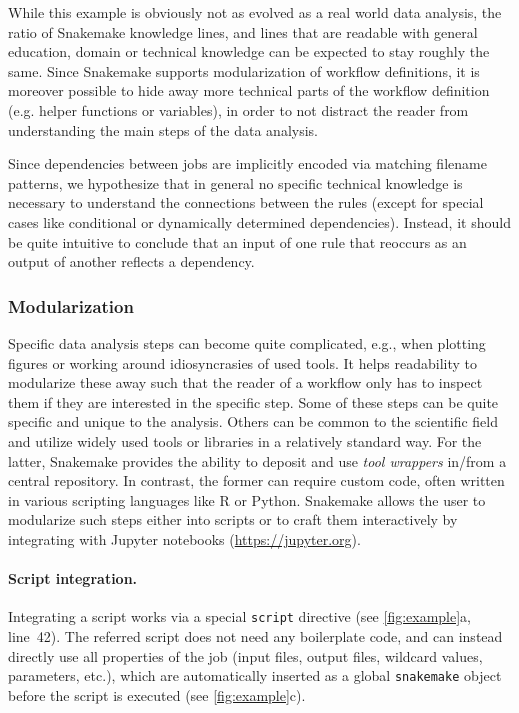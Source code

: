 \documentclass[parskip=half]{scrartcl}
\let\plainurl\url
\renewcommand{\url}[1]{\protect\plainurl{#1}}
\begin{document}
While this example is obviously not as evolved as a real world data analysis, the ratio of Snakemake knowledge lines, and lines that are readable with general education, domain or technical knowledge can be expected to stay roughly the same.
Since Snakemake supports modularization of workflow definitions, it is moreover possible to hide away more technical parts of the workflow definition (e.g. helper functions or variables), in order to not distract the reader from understanding the main steps of the data analysis.

Since dependencies between jobs are implicitly encoded via matching filename patterns, we hypothesize that in general no specific technical knowledge is necessary to understand the connections between the rules (except for special cases like conditional or dynamically determined dependencies).
Instead, it should be quite intuitive to conclude that an input of one rule that reoccurs as an output of another reflects a dependency.

\subsubsection{Modularization}\label{sec:modularization}

Specific data analysis steps can become quite complicated, e.g., when plotting figures or working around idiosyncrasies of used tools.
It helps readability to modularize these away such that the reader of a workflow only has to inspect them if they are interested in the specific step.
Some of these steps can be quite specific and unique to the analysis.
Others can be common to the scientific field and utilize widely used tools or libraries in a relatively standard way.
For the latter, Snakemake provides the ability to deposit and use \emph{tool wrappers} in/from a central repository.
In contrast, the former can require custom code, often written in various scripting languages like R or Python.
Snakemake allows the user to modularize such steps either into scripts or to craft them interactively by integrating with Jupyter notebooks (\url{https://jupyter.org}).

\paragraph{Script integration.}
Integrating a script works via a special \lstinline!script! directive (see \autoref{fig:example}a, line~42).
The referred script does not need any boilerplate code, and can instead directly use all properties of the job (input files, output files, wildcard values, parameters, etc.), which are automatically inserted as a global \lstinline!snakemake! object before the script is executed (see \autoref{fig:example}c).
\end{document}
